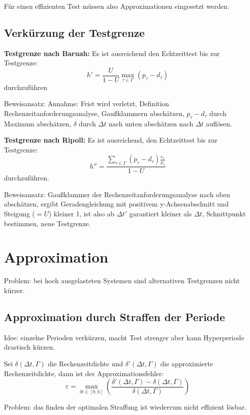 Für einen effizienten Test müssen also Approximationen eingesetzt werden.

\subsection{Verkürzung der Testgrenze}
\begin{tcolorbox}
    \textbf{Testgrenze nach Baruah:} Es ist ausreichend den Echtzeittest bis zur
    Testgrenze:
    \begin{equation}
        h' = \frac{U}{1-U} \max_{\tau \in \Gamma} (p_\tau - d_\tau)
    \end{equation}
    durchzuführen
\end{tcolorbox}

Beweisansatz: Annahme: Frist wird verletzt, 
Definition Rechenzeitanforderungsanalyse, Gaußklammern abschätzen,
$p_\tau - d_\tau$ durch Maximum abschätzen, $\delta$ durch $\Delta t$ nach unten abschätzen
nach $\Delta t$ auflösen.

\begin{tcolorbox}
    \textbf{Testgrenze nach Ripoll: } Es ist ausreichend, den Echtzeittest bis zur
    Testgrenze:
    \begin{equation}
        h'' = \frac{\sum_{\tau \in \Gamma} (p_\tau - d_\tau) \frac{c_\tau}{p_\tau}}
                {1-U}
    \end{equation}
    durchzuführen.
\end{tcolorbox}
Beweisansatz: Gaußklammer der Rechenzeitanforderungsanalyse nach oben abschätzen,
ergibt Geradengleichung mit positivem y-Achsenabschnitt und Steigung ($=U$) kleiner 1,
ist also ab $\Delta t'$ garantiert kleiner als $\Delta t$, Schnittpunkt bestimmen,
neue Testgrenze.

\section{Approximation}
Problem: bei hoch ausgelasteten Systemen sind alternativen Testgrenzen nicht kürzer.

\subsection{Approximation durch Straffen der Periode}
Idee: einzelne Perioden verkürzen, macht Test strenger aber kann Hyperperiode drastisch
kürzen.

\begin{tcolorbox}
Sei $\delta(\Delta t, \Gamma)$ die Rechenzeitdichte und $\delta'(\Delta t, \Gamma)$ die
approximierte Rechenzeitdichte, dann ist der Approximationsfehler:
\begin{equation}
    \varepsilon = \max_{\delta t \in [0, h]} \left(\frac{\delta'(\Delta t, \Gamma)-
        \delta(\Delta t, \Gamma)}{\delta(\Delta t, \Gamma)} \right)
\end{equation}
\end{tcolorbox}
Problem: das finden der optimalen Straffung ist wiederrum nicht effizient lösbar.

